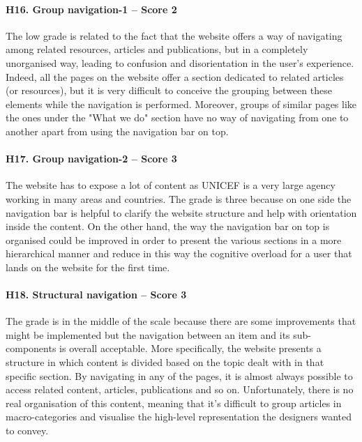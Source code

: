 \paragraph*{H16. Group navigation-1  – Score 2}
The low grade is related to the fact that the website offers a way of navigating among related resources, articles and publications, but in a completely unorganised way, leading to confusion and disorientation in the user's experience. Indeed, all the pages on the website offer a section dedicated to related articles (or resources), but it is very difficult to conceive the grouping between these elements while the navigation is performed.
Moreover, groups of similar pages like the ones under the "What we do" section have no way of navigating from one to another apart from using the navigation bar on top.

	
	
\paragraph*{H17. Group navigation-2 – Score 3}
The website has to expose a lot of content as UNICEF is a very large agency working in many areas and countries. The grade is three because on one side the navigation bar is helpful to clarify the website structure and help with orientation inside the content. On the other hand, the way the navigation bar on top is organised could be improved in order to present the various sections in a more hierarchical manner and reduce in this way the cognitive overload for a user that lands on the website for the first time.

\paragraph*{H18. Structural navigation  – Score 3}
The grade is in the middle of the scale because there are some improvements that might be implemented but the navigation between an item and its sub-components is overall acceptable. More specifically, the website presents a structure in which content is divided based on the topic dealt with in that specific section. By navigating in any of the pages, it is almost always possible to access related content, articles, publications and so on. Unfortunately, there is no real organisation of this content, meaning that it's difficult to group articles in macro-categories and visualise the high-level representation the designers wanted to convey.

